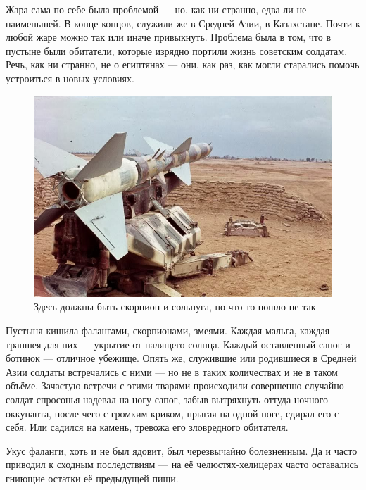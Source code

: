 Жара сама по себе была проблемой — но, как ни странно, едва ли не наименьшей. В конце концов, служили же в Средней Азии, в Казахстане. Почти к любой жаре можно так или иначе привыкнуть. Проблема была в том, что в пустыне были обитатели, которые изрядно портили жизнь советским солдатам. Речь, как ни странно, не о египтянах — они, как раз, как могли старались помочь устроиться в новых условиях.

\begin{figure}[h!tb] 
	\centering\includegraphics[scale=0.4]{Dolina_2/F8dlw3qe7jg.jpg}
	\caption{Здесь должны быть скорпион и сольпуга, но что-то пошло не так}%
\end{figure}

Пустыня кишила фалангами, скорпионами, змеями. Каждая мальга, каждая траншея для них — укрытие от палящего солнца. Каждый оставленный сапог и ботинок — отличное убежище. Опять же, служившие или родившиеся в Средней Азии солдаты встречались с ними — но не в таких количествах и не в таком объёме. Зачастую встречи с этими тварями происходили совершенно случайно - солдат спросонья надевал на ногу сапог, забыв вытряхнуть оттуда ночного оккупанта, после чего с громким криком, прыгая на одной ноге, сдирал его с себя. Или садился на камень, тревожа его зловредного обитателя.

Укус фаланги, хоть и не был ядовит, был черезвычайно болезненным. Да и часто приводил к сходным последствиям — на её челюстях-хелицерах часто оставались гниющие остатки её предыдущей пищи.

